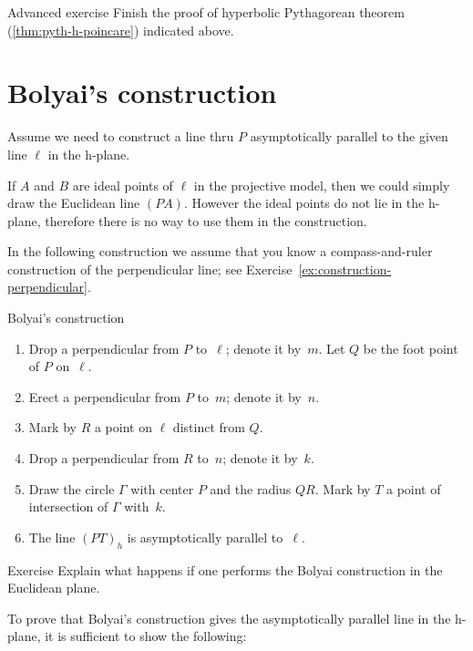 \begin{thm}{Advanced exercise}\label{ex:pyth-h-proj}
Finish the proof of hyperbolic Pythagorean theorem (\ref{thm:pyth-h-poincare}) indicated above.
\end{thm}


\section*{Bolyai's construction}

Assume we need to construct a line thru $P$ asymptotically parallel to the given line $\ell$ in the h-plane.

If $A$ and $B$ are ideal points of $\ell$ in the projective model, 
then we could simply draw the Euclidean line $(PA)$.
However the ideal points do not lie in the h-plane, therefore there is no way to use them in the construction.

In the following construction we assume that you know a compass-and-ruler construction of the perpendicular line; see Exercise~\ref{ex:construction-perpendicular}.

\begin{thm}{Bolyai's construction}
\begin{enumerate}
\item Drop a perpendicular from $P$ to~$\ell$; denote it by~$m$.
Let $Q$ be the foot point of $P$ on~$\ell$.
\item Erect a perpendicular from $P$ to~$m$; denote it by~$n$.
\item Mark by $R$ a point on $\ell$ distinct from $Q$.
\item Drop a perpendicular from $R$ to~$n$; denote it by~$k$. 
\item Draw the circle $\Gamma$ with center $P$ and the radius $QR$. 
Mark by $T$ a point of intersection of $\Gamma$ with~$k$.
\item The line $(PT)_h$ is asymptotically parallel to~$\ell$.
\end{enumerate}
\end{thm}

\begin{thm}{Exercise}\label{ex:Boyai-in-Euclid}
Explain what happens if one performs the Bolyai construction in the Euclidean plane.
\end{thm}

To prove that Bolyai's construction gives the asymptotically parallel line in the h-plane,
it is sufficient to show the following:

